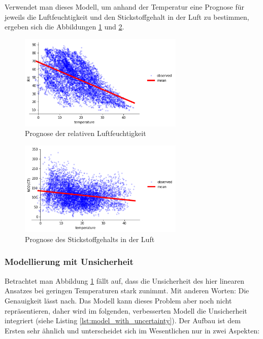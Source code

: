 \documentclass[12pt]{article}
\begin{document}
Verwendet man dieses Modell, um anhand der Temperatur eine Prognose für jeweils die Luftfeuchtigkeit und den Stickstoffgehalt in der Luft zu bestimmen, ergeben sich die Abbildungen \ref{fig:no_unc_rh} und \ref{fig:no_unc_no2}.

\begin{figure}[h]
    \centering
    \includegraphics[width=0.7\textwidth]{./figs/no_unc_rh.png}
    \caption{Prognose der relativen Luftfeuchtigkeit}
    \label{fig:no_unc_rh}
\end{figure}

\begin{figure}[h]
    \centering
    \includegraphics[width=0.7\textwidth]{./figs/no_unc_no2.png}
    \caption{Prognose des Stickstoffgehalts in der Luft}
    \label{fig:no_unc_no2}
\end{figure}


\subsubsection{Modellierung mit Unsicherheit}
\label{sec:with_unc}

Betrachtet man Abbildung \ref{fig:no_unc_rh} fällt auf, dass die Unsicherheit des hier linearen Ansatzes bei geringen Temperaturen stark zunimmt. Mit anderen Worten: Die Genauigkeit lässt nach. Das Modell kann dieses Problem aber noch nicht repräsentieren, daher wird im folgenden, verbesserten Modell die Unsicherheit integriert (siehe Listing \ref{lst:model_with_uncertainty}). Der Aufbau ist dem Ersten sehr ähnlich und unterscheidet sich im Wesentlichen nur in zwei Aspekten: 
\end{document}
